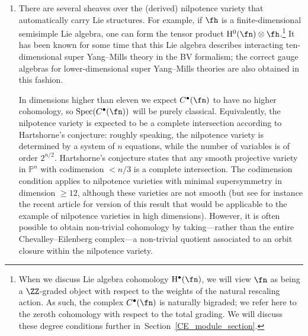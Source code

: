 \documentclass[10pt,a4paper]{amsart}
\numberwithin{equation}{section}
\def\bu{\bullet}
\DeclareMathOperator{\Spec}{Spec}
\begin{document}
\begin{enumerate}
	For example, as computed in~\cite{CederwallM5} and discussed in~\cite[Section~7.3]{spinortwist} and~\cite{MaxTwist}, if $\fn$ is the eleven-dimensional $\mathcal N=1$ supertranslation algebra, the eleven-dimensional supergravity multiplet arises from the zeroth cohomology of $C^\bullet(\fn)$, placed in degree $-3$ with respect to the natural weight grading, as a $C^\bullet(\fn)$-module. In order to obtain an \emph{interaction}, it would suffice to define, up to homotopy, a Lie structure on this module. It would be interesting to understand the action functionals of \cite{Ced-11d, Ced-towards} in this language, and to use them to connect to component actions for perturbative supergravity, either twisted or untwisted. An interacting BV theory conjecturally describing the minimal twist of eleven-dimensional supergravity was studied in~\cite{RSW}.
	
	
	\item There are several sheaves over the (derived) nilpotence variety that automatically carry Lie structures. For example, if $\fh$ is a finite-dimensional semisimple Lie algebra, one can form the tensor product $\mathrm H^0(\fn) \otimes \fh$.\footnote{When we discuss Lie algebra cohomology $\mathrm H^\bu(\fn)$, we will view $\fn$ as being a $\ZZ$-graded object with respect to the weights of the natural rescaling action. As such, the complex $C^\bullet(\fn)$ is naturally bigraded; we refer here to the zeroth cohomology with respect to the total grading. We will discuss these degree conditions further in~Section~\ref{CE_module_section}.} It has been known for some time that this Lie algebra describes interacting ten-dimensional super Yang--Mills theory in the BV formalism; the correct gauge algebras for lower-dimensional super Yang--Mills theories are also obtained in this fashion.
	
	In dimensions higher than eleven we expect $C^\bullet(\fn)$ to have no higher cohomology, so $\Spec (C^\bullet(\fn))$ will be purely classical. Equivalently, the nilpotence variety is expected to be a complete intersection according to Hartshorne's conjecture: roughly speaking, the nilpotence variety is determined by a system of $n$ equations, while the number of variables is of order $2^{n/2}$. Hartshorne's conjecture states that any smooth projective variety in $\mathbb P^n$ with codimension $<n/3$ is a complete intersection. The codimension condition applies to nilpotence varieties with minimal supersymmetry in dimension $\ge 12$, although these varieties are not smooth (but see for instance the recent article \cite{ErmanSamSnowden} for version of this result that would be applicable to the example of nilpotence varieties in high dimensions). However, it is often possible to obtain non-trivial cohomology by taking---rather than the entire Chevalley--Eilenberg complex---a non-trivial quotient associated to an orbit closure within the nilpotence variety.
	

\end{enumerate}
\end{document}
